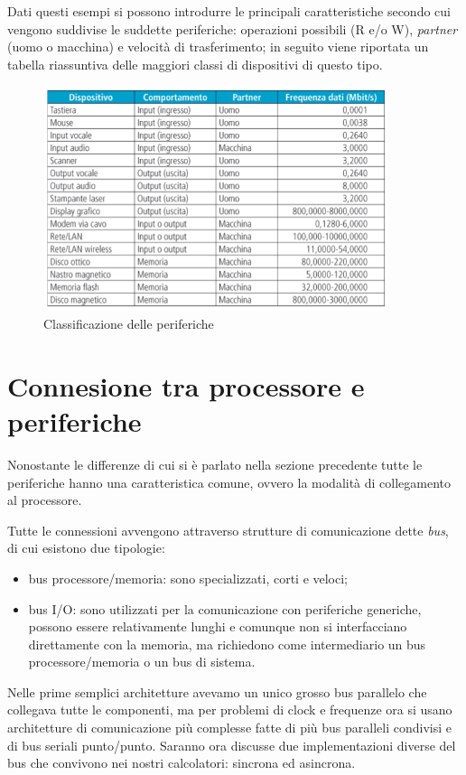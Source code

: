 \documentclass[class=book, crop=false, oneside]{standalone}
\begin{document}
Dati questi esempi si possono introdurre le principali caratteristiche secondo cui vengono suddivise le suddette periferiche: operazioni possibili (R e/o W), \emph{partner} (uomo o macchina) e velocità di trasferimento; in seguito viene riportata un tabella riassuntiva delle maggiori classi di dispositivi di questo tipo.

\begin{figure}[H]
	\centering
	\includegraphics[width=0.9\textwidth,keepaspectratio]{classificazione-periferiche}
	\caption{Classificazione delle periferiche}
\end{figure}

\section{Connesione tra processore e periferiche}
Nonostante le differenze di cui si è parlato nella sezione precedente tutte le periferiche hanno una caratteristica comune, ovvero la modalità di collegamento al processore.

Tutte le connessioni avvengono attraverso strutture di comunicazione dette \emph{bus}, di cui esistono due tipologie:
\begin{itemize}
	\item bus processore/memoria: sono specializzati, corti e veloci;
	\item bus I/O: sono utilizzati per la comunicazione con periferiche generiche, possono essere relativamente lunghi e comunque non si interfacciano direttamente con la memoria, ma richiedono come intermediario un bus processore/memoria o un bus di sistema.
\end{itemize}
Nelle prime semplici architetture avevamo un unico grosso bus parallelo che collegava tutte le componenti, ma per problemi di clock e frequenze ora si usano architetture di comunicazione più complesse fatte di più bus paralleli condivisi e di bus seriali punto/punto.
Saranno ora discusse due implementazioni diverse del bus che convivono nei nostri calcolatori: sincrona ed asincrona.
\end{document}
